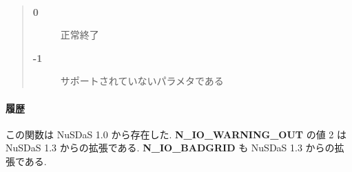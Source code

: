\paragraph{\ResultCode}
\begin{quote}
\begin{description}
\item[{\bf 0}] 正常終了
\item[{\bf -1}] サポートされていないパラメタである
\end{description}\end{quote}

\paragraph{履歴}
この関数は NuSDaS 1.0 から存在した.
{\bf N\_IO\_WARNING\_OUT} の値 2 は NuSDaS 1.3 からの拡張である.
{\bf N\_IO\_BADGRID} も NuSDaS 1.3 からの拡張である.
